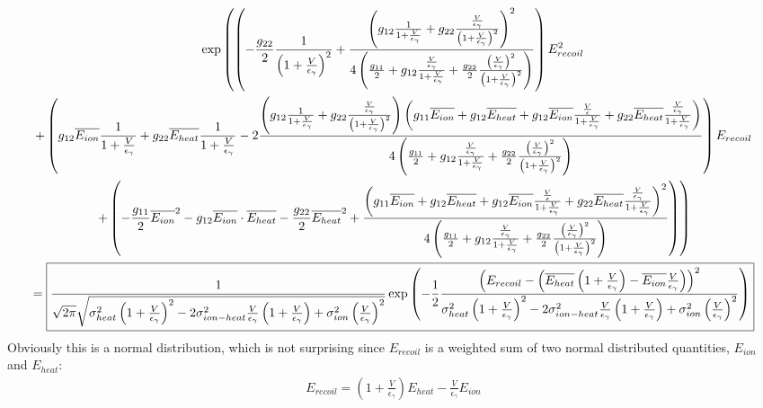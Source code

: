 \begin{landscape}
\begin{gather}
\exp \left( \left( - \frac{g_{22}}{2} \frac{1}{\left(1+ \frac{V}{\epsilon_\gamma} \right)^2} + \frac{\left( g_{12} \frac{1}{1 + \frac{V}{\epsilon_\gamma}}
+ g_{22} \frac{\frac{V}{\epsilon_\gamma}}{\left(1 + \frac{V}{\epsilon_\gamma} \right)^2} \right)^2}{4 \left( \frac{g_{11}}{2} + g_{12} \frac{\frac{V}{\epsilon_\gamma}}{1+ \frac{V}{\epsilon_\gamma}} + \frac{g_{22}}{2} \frac{ \left( \frac{V}{\epsilon_\gamma} \right)^2}{\left( 1 + \frac{V}{\epsilon_\gamma} \right)^2} \right)} \right) E_{recoil}^2 \right. \\ \left. + \left( g_{12} \overline{E_{ion}} \frac{1}{1+ \frac{V}{\epsilon_\gamma}} 
+ g_{22} \overline{E_{heat}} \frac{1}{1 + \frac{V}{\epsilon_\gamma}} - 2 \frac{\left( g_{12} \frac{1}{1 + \frac{V}{\epsilon_\gamma}}
+ g_{22} \frac{\frac{V}{\epsilon_\gamma}}{\left(1 + \frac{V}{\epsilon_\gamma} \right)^2} \right) \left(g_{11} \overline{E_{ion}} + g_{12} \overline{E_{heat}}  + g_{12} \overline{E_{ion}} \frac{\frac{V}{\epsilon}}{1+ \frac{V}{\epsilon_\gamma}}  + g_{22} \overline{E_{heat}} \frac{\frac{V}{\epsilon_\gamma}}{1+ \frac{V}{\epsilon_\gamma}} \right) }{4 \left( \frac{g_{11}}{2} + g_{12} \frac{\frac{V}{\epsilon_\gamma}}{1+ \frac{V}{\epsilon_\gamma}} + \frac{g_{22}}{2} \frac{ \left( \frac{V}{\epsilon_\gamma} \right)^2}{\left( 1 + \frac{V}{\epsilon_\gamma} \right)^2} \right)} \right) E_{recoil} \right. \\ \left. + \left(-\frac{g_{11}}{2} \overline{E_{ion}}^2 - g_{12} \overline{E_{ion}} \cdot \overline{E_{heat}} - \frac{g_{22}}{2} \overline{E_{heat}}^2 + \frac{\left(g_{11} \overline{E_{ion}} + g_{12} \overline{E_{heat}}  + g_{12} \overline{E_{ion}} \frac{\frac{V}{\epsilon}}{1+ \frac{V}{\epsilon_\gamma}}  + g_{22} \overline{E_{heat}} \frac{\frac{V}{\epsilon_\gamma}}{1+ \frac{V}{\epsilon_\gamma}} \right)^2}{4 \left( \frac{g_{11}}{2} + g_{12} \frac{\frac{V}{\epsilon_\gamma}}{1+ \frac{V}{\epsilon_\gamma}} + \frac{g_{22}}{2} \frac{ \left( \frac{V}{\epsilon_\gamma} \right)^2}{\left( 1 + \frac{V}{\epsilon_\gamma} \right)^2} \right)} \right) \right) \\
= \framebox{$\displaystyle \frac{1}{\sqrt{2 \pi} \sqrt{ \sigma_{heat}^2 \left(1 + \frac{V}{\epsilon_\gamma} \right)^2 - 2 \sigma_{ion-heat}^2 \frac{V}{\epsilon_\gamma} \left( 1 + \frac{V}{\epsilon_\gamma} \right) + \sigma_{ion}^2 \left( \frac{V}{\epsilon_\gamma} \right)^2}} \exp \left( - \frac{1}{2} \frac{\left(E_{recoil} - \left( \overline{E_{heat}} \left( 1 + \frac{V}{\epsilon_\gamma} \right) - \overline{E_{ion}} \frac{V}{\epsilon_\gamma} \right) \right)^2}{\sigma_{heat}^2 \left(1 + \frac{V}{\epsilon_\gamma} \right)^2 - 2 \sigma_{ion-heat}^2 \frac{V}{\epsilon_\gamma} \left( 1 + \frac{V}{\epsilon_\gamma} \right) + \sigma_{ion}^2 \left( \frac{V}{\epsilon_\gamma} \right)^2} \right) $} \label{propfuncMargE}
\end{gather}
Obviously this is a normal distribution, which is not surprising since $E_{recoil}$ is a weighted sum of two normal distributed quantities, $E_{ion}$ and $E_{heat}$:
\begin{gather}
E_{recoil} = \left( 1 + \frac{V}{\epsilon_\gamma} \right) E_{heat} - \frac{V}{\epsilon_\gamma} E_{ion}
\end{gather}

\end{landscape}





